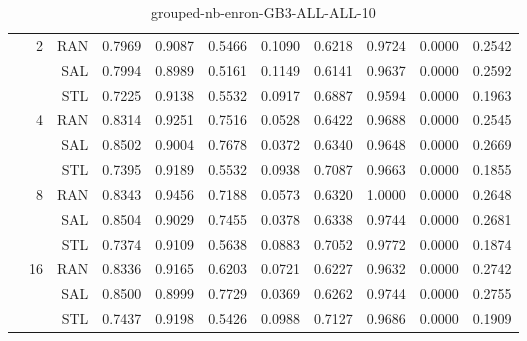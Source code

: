 \begin{center}
\begin{table}[htbp]
\begin{center}
\begin{tabular}{ | r | r | r | r | r | r | r | r | r | r | r |}
 & \multirow{3}{*}{2} & RAN & 0.7969 & 0.9087 & 0.5466 & 0.1090 & 0.6218 & 0.9724 & 0.0000 & 0.2542\\ \cline{3-11}
 &   & SAL & 0.7994 & 0.8989 & 0.5161 & 0.1149 & 0.6141 & 0.9637 & 0.0000 & 0.2592\\ \cline{3-11}
 &   & STL & 0.7225 & 0.9138 & 0.5532 & 0.0917 & 0.6887 & 0.9594 & 0.0000 & 0.1963\\ \cline{2-11}
 & \multirow{3}{*}{4} & RAN & 0.8314 & 0.9251 & 0.7516 & 0.0528 & 0.6422 & 0.9688 & 0.0000 & 0.2545\\ \cline{3-11}
 &   & SAL & 0.8502 & 0.9004 & 0.7678 & 0.0372 & 0.6340 & 0.9648 & 0.0000 & 0.2669\\ \cline{3-11}
 &   & STL & 0.7395 & 0.9189 & 0.5532 & 0.0938 & 0.7087 & 0.9663 & 0.0000 & 0.1855\\ \cline{2-11}
 & \multirow{3}{*}{8} & RAN & 0.8343 & 0.9456 & 0.7188 & 0.0573 & 0.6320 & 1.0000 & 0.0000 & 0.2648\\ \cline{3-11}
 &   & SAL & 0.8504 & 0.9029 & 0.7455 & 0.0378 & 0.6338 & 0.9744 & 0.0000 & 0.2681\\ \cline{3-11}
 &   & STL & 0.7374 & 0.9109 & 0.5638 & 0.0883 & 0.7052 & 0.9772 & 0.0000 & 0.1874\\ \cline{2-11}
 & \multirow{3}{*}{16} & RAN & 0.8336 & 0.9165 & 0.6203 & 0.0721 & 0.6227 & 0.9632 & 0.0000 & 0.2742\\ \cline{3-11}
 &   & SAL & 0.8500 & 0.8999 & 0.7729 & 0.0369 & 0.6262 & 0.9744 & 0.0000 & 0.2755\\ \cline{3-11}
 &   & STL & 0.7437 & 0.9198 & 0.5426 & 0.0988 & 0.7127 & 0.9686 & 0.0000 & 0.1909\\ \cline{2-11}
\hline
\end{tabular}
\caption{grouped-nb-enron-GB3-ALL-ALL-10}
\end{center}
 \end{table}
\end{center}

